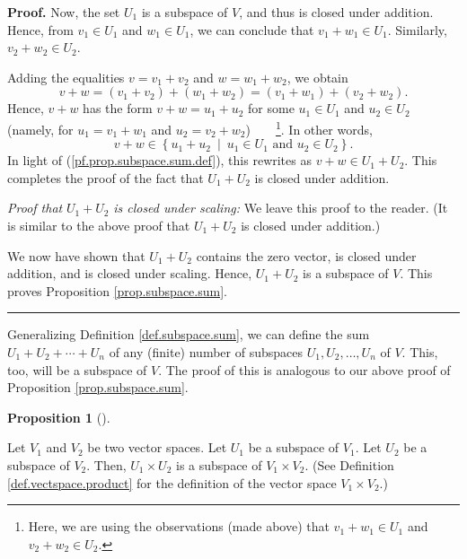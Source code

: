 \documentclass[numbers=enddot,12pt,final,onecolumn,notitlepage]{scrartcl}%
\theoremstyle{definition}
\newtheorem{prop}[theo]{Proposition}
\newenvironment{proposition}[1][]
{\begin{prop}[#1]\begin{leftbar}}
{\end{leftbar}\end{prop}}
\newenvironment{proof}[1][Proof]{\noindent\textbf{#1.} }{\ \rule{0.5em}{0.5em}}
\begin{document}
\begin{proof}
Now, the set $U_{1}$ is a subspace of $V$, and thus is closed under addition.
Hence, from $v_{1}\in U_{1}$ and $w_{1}\in U_{1}$, we can conclude that
$v_{1}+w_{1}\in U_{1}$. Similarly, $v_{2}+w_{2}\in U_{2}$.

Adding the equalities $v=v_{1}+v_{2}$ and $w=w_{1}+w_{2}$, we obtain%
\[
v+w=\left(  v_{1}+v_{2}\right)  +\left(  w_{1}+w_{2}\right)  =\left(
v_{1}+w_{1}\right)  +\left(  v_{2}+w_{2}\right)  .
\]
Hence, $v+w$ has the form $v+w=u_{1}+u_{2}$ for some $u_{1}\in U_{1}$ and
$u_{2}\in U_{2}$ (namely, for $u_{1}=v_{1}+w_{1}$ and $u_{2}=v_{2}+w_{2}%
$)\ \ \ \ \footnote{Here, we are using the observations (made above) that
$v_{1}+w_{1}\in U_{1}$ and $v_{2}+w_{2}\in U_{2}$.}. In other words,%
\[
v+w\in\left\{  u_{1}+u_{2}\ \mid\ u_{1}\in U_{1}\text{ and }u_{2}\in
U_{2}\right\}  .
\]
In light of (\ref{pf.prop.subspace.sum.def}), this rewrites as $v+w\in
U_{1}+U_{2}$. This completes the proof of the fact that $U_{1}+U_{2}$ is
closed under addition.

\textit{Proof that }$U_{1}+U_{2}$ \textit{is closed under scaling:} We leave
this proof to the reader. (It is similar to the above proof that $U_{1}+U_{2}$
is closed under addition.)

We now have shown that $U_{1}+U_{2}$ contains the zero vector, is closed under
addition, and is closed under scaling. Hence, $U_{1}+U_{2}$ is a subspace of
$V$. This proves Proposition \ref{prop.subspace.sum}.
\end{proof}

Generalizing Definition \ref{def.subspace.sum}, we can define the sum
$U_{1}+U_{2}+\cdots+U_{n}$ of any (finite) number of subspaces $U_{1}%
,U_{2},\ldots,U_{n}$ of $V$. This, too, will be a subspace of $V$. The proof
of this is analogous to our above proof of Proposition \ref{prop.subspace.sum}.

\begin{proposition}
\label{prop.subspace.dirprod}Let $V_{1}$ and $V_{2}$ be two vector spaces. Let
$U_{1}$ be a subspace of $V_{1}$. Let $U_{2}$ be a subspace of $V_{2}$. Then,
$U_{1}\times U_{2}$ is a subspace of $V_{1}\times V_{2}$. (See Definition
\ref{def.vectspace.product} for the definition of the vector space
$V_{1}\times V_{2}$.)
\end{proposition}
\end{document}
